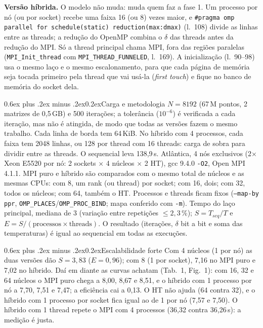 \documentclass[10pt,a4paper,twocolumn]{article}
\makeatletter
\renewcommand\section{\@startsection{section}{1}{0pt}%
  {0.6ex plus .2ex minus .2ex}{0.2ex}{\normalsize\bfseries}}
\makeatother
\begin{document}
\textbf{Versão híbrida.} O modelo não muda: muda quem faz a fase 1. Um
processo por nó (ou por socket) recebe uma faixa 16 (ou 8) vezes maior, e
\texttt{\#pragma omp parallel for schedule(static) reduction(max:dmax)} (l.~108)
divide as linhas entre as threads; a redução do OpenMP combina o $\delta$ das
threads antes da redução do MPI. Só a thread principal chama MPI, fora das
regiões paralelas (\texttt{MPI\_Init\_thread} com
\texttt{MPI\_THREAD\_FUNNELED}, l.~169). A inicialização (l.~90--98) usa o mesmo laço e o
mesmo escalonamento, para que cada página de memória seja tocada primeiro pela
thread que vai usá-la (\emph{first touch}) e fique no banco de memória do
socket dela.

\section{Carga e metodologia}
$N = 8192$ (67\,M pontos, 2 matrizes de 0,5\,GB) e 500 iterações; a
tolerância ($10^{-6}$) é verificada a cada iteração, mas não é atingida, de
modo que todas as versões fazem o mesmo trabalho. Cada linha de borda tem
64\,KiB. No híbrido com 4 processos, cada faixa tem 2048 linhas, ou 128 por
thread com 16 threads: carga de sobra para dividir entre as threads.
O sequencial leva 138,9\,s. Atlântica, 4 nós exclusivos (2$\times$ Xeon E5520
por nó: 2 sockets $\times$ 4 núcleos $\times$ 2 HT), gcc 9.4.0 \texttt{-O2},
Open MPI 4.1.1. MPI puro e híbrido são comparados com o mesmo total de
núcleos e as mesmas CPUs: com 8, um rank (ou thread) por socket; com 16, dois;
com 32, todos os núcleos; com 64, também o HT. Processos e threads ficam
fixos (\texttt{--map-by ppr}, \texttt{OMP\_PLACES}/\texttt{OMP\_PROC\_BIND};
mapa conferido com \texttt{-m}). Tempo do laço principal, mediana de 3
(variação entre repetições $\le 2{,}3$\,\%);
$S = T_{seq}/T$ e $E = S/(\text{processos} \times \text{threads})$. O
resultado (iterações, $\delta$ bit a bit e soma das temperaturas) é igual ao
sequencial em todas as execuções.

\section{Escalabilidade forte}
Com 4 núcleos (1 por nó) as duas versões dão $S = 3{,}83$ ($E = 0{,}96$);
com 8 (1 por socket), 7,16 no MPI puro e 7,02 no híbrido. Daí em diante as
curvas achatam (Tab.~1, Fig.~1): com 16, 32 e 64 núcleos o MPI puro chega a
8,00, 8,67 e 8,51, e o híbrido com 1 processo por nó a 7,70, 7,51 e 7,47; a
eficiência cai a 0,13. O HT não ajuda (64 contra 32), e o híbrido com 1
processo por socket fica igual ao de 1 por nó (7,57 e 7,50). O híbrido com 1
thread repete o MPI com 4 processos (36,32 contra 36,26\,s): a medição é justa.
\end{document}
